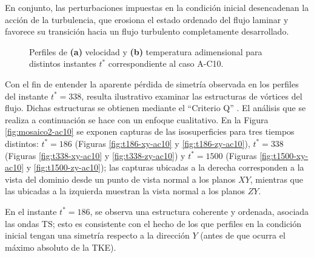 En conjunto, las perturbaciones impuestas en la condición inicial desencadenan la acción de la turbulencia, que erosiona el estado ordenado del flujo laminar y favorece su transición hacia un flujo turbulento completamente desarrollado.

\begin{figure}[H]
  \centering  
  
  \caption{Perfiles de \textbf{(a)} velocidad y \textbf{(b)} temperatura adimensional para distintos instantes $t^*$ correspondiente al caso A-C10.}
  \label{fig:mosaico-ac10}
\end{figure} 

Con el fin de entender la aparente pérdida de simetría observada en los perfiles del instante $t^* = 338$, resulta ilustrativo examinar las estructuras de vórtices del flujo. Dichas estructuras se obtienen mediante el ``Criterio Q'' \cite{hunt1988eddies}. El análisis que se realiza a continuación se hace con un enfoque cualitativo. En la Figura \ref{fig:mosaico2-ac10} se exponen capturas de las isosuperficies para tres tiempos distintos: $t^* = 186$ (Figuras \ref{fig:t186-xy-ac10} y  \ref{fig:t186-zy-ac10}),  $t^* = 338$  (Figuras \ref{fig:t338-xy-ac10} y  \ref{fig:t338-zy-ac10}) y  $t^* = 1500$  (Figuras \ref{fig:t1500-xy-ac10} y  \ref{fig:t1500-zy-ac10}); las capturas ubicadas a la derecha corresponden a la vista del dominio desde un punto de vista normal a los planos $XY$, mientras que las ubicadas a la izquierda muestran la vista normal a los planos $ZY$.

En el instante $t^* = 186$, se observa una estructura coherente y ordenada, asociada las ondas TS; esto es consistente con el hecho de los que perfiles en la condición inicial tengan una simetría respecto a la dirección $Y$ (antes de que ocurra el máximo absoluto de la TKE). 

